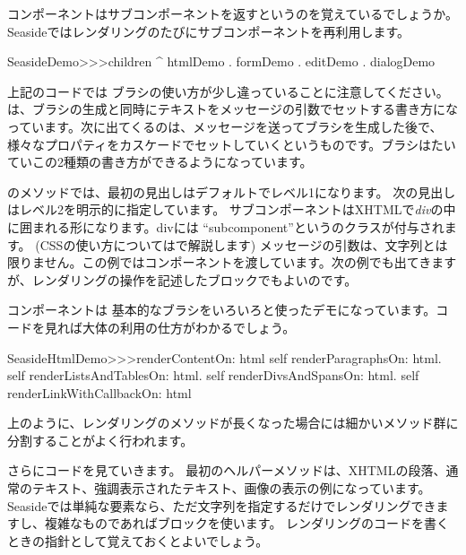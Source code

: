 \documentclass[a4paper,10pt,twoside]{book}
\begin{document}
\noindent
コンポーネントはサブコンポーネントを返すというのを覚えているでしょうか。Seasideではレンダリングのたびにサブコンポーネントを再利用します。
\begin{code}{}
SeasideDemo>>>children
	^ { htmlDemo . formDemo . editDemo . dialogDemo }
\end{code}

上記のコードでは  ブラシの使い方が少し違っていることに注意してください。は、ブラシの生成と同時にテキストをメッセージの引数でセットする書き方になっています。次に出てくるのは、メッセージを送ってブラシを生成した後で、様々なプロパティをカスケードでセットしていくというものです。ブラシはたいていこの2種類の書き方ができるようになっています。


のメソッドでは、最初の見出しはデフォルトでレベル1になります。
次の見出しはレベル2を明示的に指定しています。
サブコンポーネントはXHTMLで\emph{div}の中に囲まれる形になります。divには ``subcomponent''というのクラスが付与されます。
(CSSの使い方についてはで解説します)
 メッセージの引数は、文字列とは限りません。この例ではコンポーネントを渡しています。次の例でも出てきますが、レンダリングの操作を記述したブロックでもよいのです。

コンポーネントは 基本的なブラシをいろいろと使ったデモになっています。コードを見れば大体の利用の仕方がわかるでしょう。

\begin{code}{}
SeasideHtmlDemo>>>renderContentOn: html 
	self renderParagraphsOn: html.
	self renderListsAndTablesOn: html.
	self renderDivsAndSpansOn: html.
	self renderLinkWithCallbackOn: html
\end{code}

上のように、レンダリングのメソッドが長くなった場合には細かいメソッド群に分割することがよく行われます。


さらにコードを見ていきます。
最初のヘルパーメソッドは、XHTMLの段落、通常のテキスト、強調表示されたテキスト、画像の表示の例になっています。
Seasideでは単純な要素なら、ただ文字列を指定するだけでレンダリングできますし、複雑なものであればブロックを使います。
レンダリングのコードを書くときの指針として覚えておくとよいでしょう。
\end{document}
